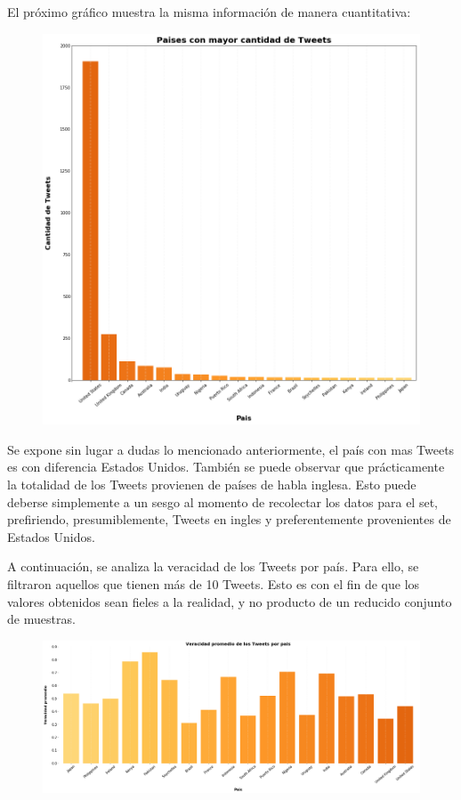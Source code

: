 \documentclass[titlepage,a4paper]{article}
\begin{document}
    El próximo gráfico muestra la misma información de manera cuantitativa:
    
    \begin{figure}[H]
    \centering
    \includegraphics[width=1\textwidth]{graficos/Analisis de Locacion/paises_con_mayor_cantidad_de_tweets.png}
    \caption{}
    \end{figure}
    
    Se expone sin lugar a dudas lo mencionado anteriormente, el país con mas Tweets es con diferencia Estados Unidos. También se puede observar que prácticamente la totalidad de los Tweets provienen de países de habla inglesa. Esto puede deberse simplemente a  un sesgo al momento de recolectar los datos para el set, prefiriendo, presumiblemente, Tweets en ingles y preferentemente provenientes de Estados Unidos.
    
    A continuación, se analiza la veracidad de los Tweets por país. Para ello, se filtraron aquellos que tienen más de 10 Tweets. Esto es con el fin de que los valores obtenidos sean fieles a la realidad, y no producto de un reducido conjunto de muestras.

    \begin{figure}[H]
    \centering
    \includegraphics[width=1\textwidth]{graficos/Analisis de Locacion/veracidad_promedio_de_los_tweets_por_pais.png}
    \caption{}
    \end{figure}
    
\end{document}
